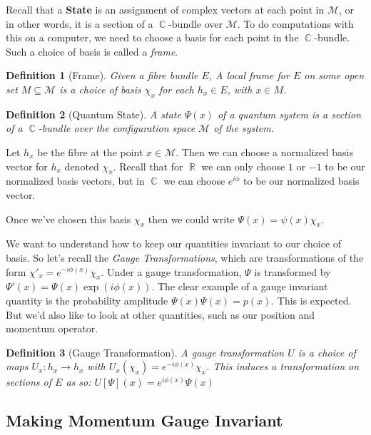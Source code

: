 \documentclass{article}
\DeclareMathOperator{\RR}{\mathbb{R}}
\DeclareMathOperator{\CC}{\mathbb{C}}
\newtheorem{defn}{Definition}
\begin{document}
Recall that a \textbf{State} is an assignment of complex vectors at each point in $\mathcal{M}$, or in other words, it is a section of a $\CC$-bundle over $\mathcal{M}$. To do computations with this on a computer, we need to choose a basis for each point in the $\CC$-bundle. Such a choice of basis is called a \textit{frame}.

\begin{defn}[Frame]
	Given a fibre bundle $E$, A \textit{local frame} for $E$ on some open set $M \subseteq \mathcal{M}$ is a choice of basis $\chi_x$ for each $h_x \in E$, with $x \in M$.
\end{defn}

\begin{defn}[Quantum State]
	A state $\Psi(x)$ of a quantum system is a \textit{section} of a $\CC$-bundle over the configuration space $\mathcal{M}$ of the system.
\end{defn}

Let $h_x$ be the fibre at the point $x \in \mathcal{M}$. Then we can choose a normalized basis vector for $h_x$ denoted $\chi_x$. Recall that for $\RR$ we can only choose $1$ or $-1$ to be our normalized basis vectors, but in $\CC$ we can choose $e^{i\phi}$ to be our normalized basis vector.

Once we've chosen this basis $\chi_x$ then we could write $\Psi(x) = \psi(x) \chi_x$.

We want to understand how to keep our quantities invariant to our choice of basis. So let's recall the \textit{Gauge Transformations}, which are transformations of the form $\chi'_x = e^{-i\phi(x)}\chi_x$. Under a gauge transformation, $\Psi$ is transformed by $\Psi'(x) = \Psi(x) \exp(i\phi(x))$. The clear example of a gauge invariant quantity is the probability amplitude $\overline{\Psi(x)}\Psi(x) = p(x)$. This is expected. But we'd also like to look at other quantities, such as our position and momentum operator.

\begin{defn}[Gauge Transformation]
	A gauge transformation $U$ is a choice of maps $U_x : h_x \to h_x$ with $U_x(\chi_x) = e^{-i\phi(x)}\chi_x$. This induces a transformation on sections of $E$ as so: $U[\Psi](x) = e^{i\phi(x)}\Psi(x) $
\end{defn}

\subsection{Making Momentum Gauge Invariant}
\end{document}
